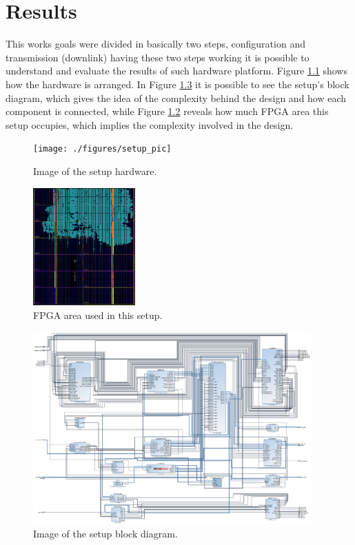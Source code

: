 \chapter{Results}
\label{chap:results}

This works goals were divided in basically two steps, configuration and
transmission (downlink) having these two steps working it is possible to
understand and evaluate the results of such hardware platform. Figure
\ref{fig:setup} shows how the hardware is arranged. In Figure \ref{fig:setupbd}
it is possible to see the setup's block diagram, which gives the idea of the
complexity behind the design and how each component is connected, while Figure
\ref{fig:fpgaarea} reveals how much FPGA area this setup occupies, which implies
the complexity involved in the design.

\begin{figure}[htbp]
    \centering
    \texttt{[image: ./figures/setup\_pic]}
    \caption{ Image of the setup hardware.
    \label{fig:setup}}
\end{figure}

\begin{figure}[htbp]
    \centering
    \includegraphics[width=0.35\textwidth]{./figures/fpga_area}
    \caption{ FPGA area used in this setup.
    \label{fig:fpgaarea}}
\end{figure}

\begin{figure}[htbp]
    \centering
    \includegraphics[width=0.95\textwidth]{./figures/setup_bd}
    \caption{ Image of the setup block diagram.
    \label{fig:setupbd}}
\end{figure}

